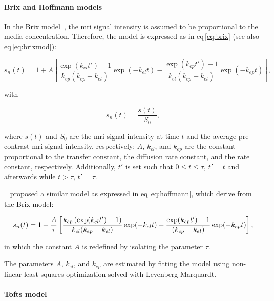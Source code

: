 \paragraph{Brix and Hoffmann models}\label{par:chp5:DCE-norm:brixhoffmann}

In the Brix model~\cite{brix1991pharmacokinetic}, the \ac{mri} signal intensity is assumed to be proportional to the media concentration.
Therefore, the model is expressed as in \acs{eq}\,\eqref{eq:brix} (see also \acs{eq}\,\eqref{eq:brixmod}):

\begin{equation}
  s_n(t) = 1 + A \left[ \frac{\exp(k_{el} t') - 1}{k_{ep}(k_{ep} - k_{el})} \exp(- k_{el} t) - \frac{\exp(k_{ep} t') - 1}{k_{el}(k_{ep} - k_{el})} \exp(- k_{ep} t) \right],
  \label{eq:brix}
\end{equation}

\noindent with

\begin{equation}
  s_n(t) = \frac{s(t)}{S_0},
  \label{eq:enh}
\end{equation}

\noindent where $s(t)$ and $S_0$ are the \ac{mri} signal intensity at time $t$ and the average pre-contrast \ac{mri} signal intensity, respectively; $A$, $k_{el}$, and $k_{ep}$ are the constant proportional to the transfer constant, the diffusion rate constant, and the rate constant, respectively.
Additionally, $t'$ is set such that $0 \leq t \leq \tau$, $t' = t$ and afterwards while $t > \tau$, $t' = \tau$.

\citeauthor{hoffmann1995pharmacokinetic}~\cite{hoffmann1995pharmacokinetic} proposed a similar model as expressed in \acs{eq}\,\eqref{eq:hoffmann}, which derive from the Brix model:

\begin{equation}
  \small
  s_n(t) = 1 + \frac{A}{\tau} \left[ \frac{k_{ep} \left( \exp(k_{el} t') - 1 \right)}{k_{el}(k_{ep} - k_{el})} \exp(- k_{el} t) - \frac{\exp(k_{ep} t') - 1}{(k_{ep} - k_{el})} \exp(- k_{ep} t) \right] ,
  \label{eq:hoffmann}
\end{equation}

\noindent in which the constant $A$ is redefined by isolating the parameter $\tau$.

The parameters $A$, $k_{el}$, and $k_{ep}$ are estimated by fitting the model using non-linear least-squares optimization solved with Levenberg-Marquardt.

\paragraph{Tofts model}\label{par:chp5:DCE-norm:tofts}


